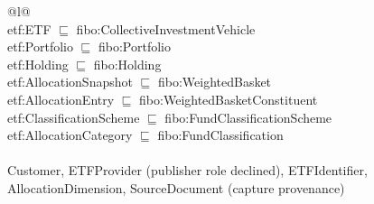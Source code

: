 \begin{table}[t]
\centering
\scriptsize
\caption{The reuse boundary. Seven classes specialise FIBO terms; five classes and
the observation attributes use project-specific definitions.}
\label{tab:alignment}
\begin{tabular}{@{}l@{}}
\toprule
{}\\
etf:ETF $\sqsubseteq$ fibo:CollectiveInvestmentVehicle \\
etf:Portfolio $\sqsubseteq$ fibo:Portfolio \\
etf:Holding $\sqsubseteq$ fibo:Holding \\
etf:AllocationSnapshot $\sqsubseteq$ fibo:WeightedBasket \\
etf:AllocationEntry $\sqsubseteq$ fibo:WeightedBasketConstituent \\
etf:ClassificationScheme $\sqsubseteq$ fibo:FundClassificationScheme \\
etf:AllocationCategory $\sqsubseteq$ fibo:FundClassification \\
\midrule
{}\\
Customer, ETFProvider (publisher role declined), ETFIdentifier, \\
AllocationDimension, SourceDocument (capture provenance) \\
\bottomrule
\end{tabular}
\end{table}
